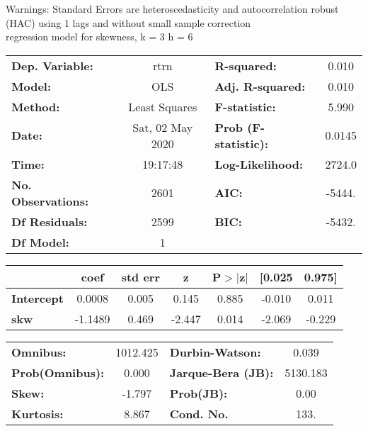 Warnings: \newline
 [1] Standard Errors are heteroscedasticity and autocorrelation robust (HAC) using 1 lags and without small sample correction\\ 

regression model for skewness, k = 3 h = 6\begin{center}
\begin{tabular}{lclc}
\toprule
\textbf{Dep. Variable:}    &       rtrn       & \textbf{  R-squared:         } &     0.010   \\
\textbf{Model:}            &       OLS        & \textbf{  Adj. R-squared:    } &     0.010   \\
\textbf{Method:}           &  Least Squares   & \textbf{  F-statistic:       } &     5.990   \\
\textbf{Date:}             & Sat, 02 May 2020 & \textbf{  Prob (F-statistic):} &   0.0145    \\
\textbf{Time:}             &     19:17:48     & \textbf{  Log-Likelihood:    } &    2724.0   \\
\textbf{No. Observations:} &        2601      & \textbf{  AIC:               } &    -5444.   \\
\textbf{Df Residuals:}     &        2599      & \textbf{  BIC:               } &    -5432.   \\
\textbf{Df Model:}         &           1      & \textbf{                     } &             \\
\bottomrule
\end{tabular}
\begin{tabular}{lcccccc}
                   & \textbf{coef} & \textbf{std err} & \textbf{z} & \textbf{P$> |$z$|$} & \textbf{[0.025} & \textbf{0.975]}  \\
\midrule
\textbf{Intercept} &       0.0008  &        0.005     &     0.145  &         0.885        &       -0.010    &        0.011     \\
\textbf{skw}       &      -1.1489  &        0.469     &    -2.447  &         0.014        &       -2.069    &       -0.229     \\
\bottomrule
\end{tabular}
\begin{tabular}{lclc}
\textbf{Omnibus:}       & 1012.425 & \textbf{  Durbin-Watson:     } &    0.039  \\
\textbf{Prob(Omnibus):} &   0.000  & \textbf{  Jarque-Bera (JB):  } & 5130.183  \\
\textbf{Skew:}          &  -1.797  & \textbf{  Prob(JB):          } &     0.00  \\
\textbf{Kurtosis:}      &   8.867  & \textbf{  Cond. No.          } &     133.  \\
\bottomrule
\end{tabular}
\end{center}

